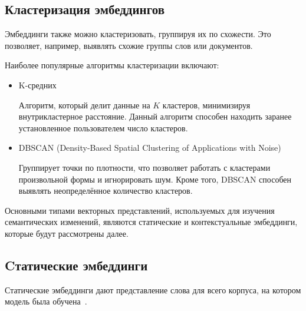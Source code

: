 \documentclass[LI,VKR]{HSEUniversity}
\begin{document}
\subsection{Кластеризация эмбеддингов}

Эмбеддинги также можно кластеризовать, группируя их по схожести.
Это позволяет, например, выявлять схожие группы слов или документов.

Наиболее популярные алгоритмы кластеризации включают:

\begin{itemize}
    \item K-средних

Алгоритм, который делит данные на \(K\) кластеров, минимизируя внутрикластерное расстояние.
Данный алгоритм способен находить заранее установленное пользователем число кластеров.
    \item DBSCAN (Density-Based Spatial Clustering of Applications with Noise)~\cite{DBSCAN}

Группирует точки по плотности, что позволяет работать с кластерами произвольной формы и игнорировать шум.
Кроме того, DBSCAN способен выявлять неопределённое количество кластеров.
\end{itemize}

Основными типами векторных представлений, используемых для изучения семантических изменений,
являются статические и контекстуальные эмбеддинги,
которые будут рассмотрены далее.

\subsection{Cтатические эмбеддинги}


Статические эмбеддинги дают представление слова для всего корпуса,
на котором модель была обучена~\cite{TahmasebiComputationalApproachesToSemanticChange}.
\end{document}
